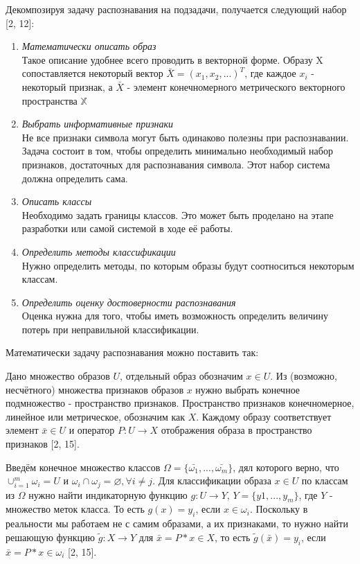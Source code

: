 \documentclass[12pt,a4paper]{article}
\begin{document}
Декомпозируя задачу распознавания на подзадачи, получается следующий набор [2, 12]:
\begin{enumerate}
    \item \textit{Математически описать образ}\\
        Такое описание удобнее всего проводить в векторной форме. Образу X сопоставляется некоторый вектор $\bar{X}=(x_1,x_2,...)^T$, где каждое $x_i$ - некоторый признак, а $\bar{X}$ - элемент конечномерного метрического векторного пространства $\mathbb{X}$
    \item \textit{Выбрать информативные признаки}\\
        Не все признаки символа могут быть одинаково полезны при распознавании. Задача состоит в том, чтобы определить минимально необходимый набор признаков, достаточных для распознавания символа. Этот набор система должна определить сама.
    \item \textit{Описать классы}\\
        Необходимо задать границы классов. Это может быть проделано на этапе разработки или самой системой в ходе её работы.
    \item \textit{Определить методы классификации}\\
        Нужно определить методы, по которым образы будут соотноситься некоторым классам.
    \item \textit{Определить оценку достоверности распознавания}\\
        Оценка нужна для того, чтобы иметь возможность определить величину потерь при неправильной классификации.
\end{enumerate}

Математически задачу распознавания можно поставить так:

Дано множество образов $U$, отдельный образ обозначим $x\in U$. Из (возможно, несчётного) множества признаков образов $x$ нужно выбрать конечное подмножество - пространство признаков. Пространство признаков конечномерное, линейное или метрическое, обозначим как $X$. Каждому образу соответствует элемент $\bar{x} \in U$ и оператор $P: U \longrightarrow X$ отображения образа в пространство признаков [2, 15].

Введём конечное множество классов $\Omega=\{\bar{\omega_1}, ..., \bar{\omega_m}\}$, дял которого верно, что $\cup_{i=1}^m\omega_i = U$ и $\omega_i \cap \omega_j = \varnothing, \forall i \not= j$. Для классификации образа $x \in U$ по классам из $\Omega$ нужно найти индикаторную функцию $g: U \longrightarrow Y$, $Y=\{y1, ..., y_m\}$, где $Y$ - множество меток класса. То есть $g(x)=y_i$, если $x \in \omega_i$. Поскольку в реальности мы работаем не с самим образами, а их признаками, то нужно найти решающую функцию $\tilde{g}: X \longrightarrow Y$ для $\bar{x}=P*x \in X$, то есть $\tilde{g}(\bar{x})=y_i$, если $\bar{x}=P*x \in \omega_i$ [2, 15].
\end{document}
